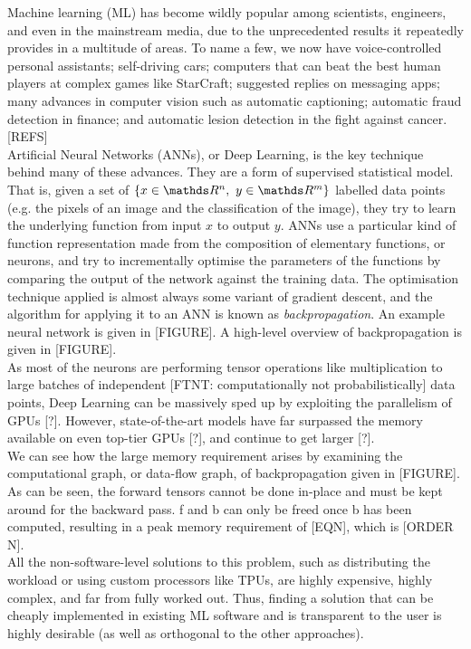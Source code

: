 Machine learning (ML) has become wildly popular among scientists, engineers, and even in the mainstream media, due to the unprecedented results it repeatedly provides in a multitude of areas. To name a few, we now have voice-controlled personal assistants; self-driving cars; computers that can beat the best human players at complex games like StarCraft; suggested replies on messaging apps; many advances in computer vision such as automatic captioning; automatic fraud detection in finance; and automatic lesion detection in the fight against cancer. [REFS] \\

Artificial Neural Networks (ANNs), or Deep Learning, is the key technique behind many of these advances. They are a form of supervised statistical model. That is, given a set of \(\{x \in \R^n, \ y \in \R^m\}\) labelled data points (e.g. the pixels of an image and the classification of the image), they try to learn the underlying function from input \(x\) to output \(y\). ANNs use a particular kind of function representation made from the composition of elementary functions, or neurons, and try to incrementally optimise the parameters of the functions by comparing the output of the network against the training data. The optimisation technique applied is almost always some variant of gradient descent, and the algorithm for applying it to an ANN is known as \textit{backpropagation}. An example neural network is given in [FIGURE]. A high-level overview of backpropagation is given in [FIGURE]. \\

As most of the neurons are performing tensor operations like multiplication to large batches of independent [FTNT: computationally not probabilistically] data points, Deep Learning can be massively sped up by exploiting the parallelism of GPUs [?]. However, state-of-the-art models have far surpassed the memory available on even top-tier GPUs [?], and continue to get larger [?]. \\

We can see how the large memory requirement arises by examining the computational graph, or data-flow graph, of backpropagation given in [FIGURE]. As can be seen, the forward tensors cannot be done in-place and must be kept around for the backward pass. f and b can only be freed once b has been computed, resulting in a peak memory requirement of [EQN], which is [ORDER N]. \\

All the non-software-level solutions to this problem, such as distributing the workload or using custom processors like TPUs, are highly expensive, highly complex, and far from fully worked out. Thus, finding a solution that can be cheaply implemented in existing ML software and is transparent to the user is highly desirable (as well as orthogonal to the other approaches). \\

